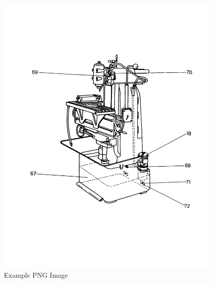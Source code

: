 \newpage
\begin{figure}[h]
    \centering
    \includegraphics[width=1.0\linewidth]{./images/page_29}
    \caption{Example PNG Image}
    \label{fig:cooling_system}
\end{figure}
